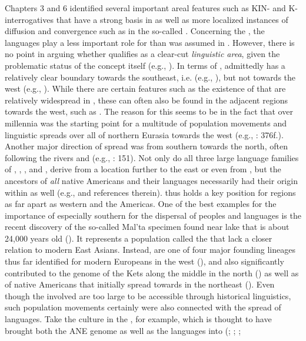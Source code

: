 Chapters 3 and 6 identified several important areal features such as KIN- and K-interrogatives that have a strong basis in  as well as more localized instances of diffusion and convergence such as in the so-called . Concerning the , the  languages play a less important role for  than was assumed in . However, there is no point in arguing whether  qualifies as a clear-cut \textit{linguistic area}, given the problematic status of the concept itself (e.g., \citealt{Campbell2006}). In terms of ,  admittedly has a relatively clear boundary towards the southeast, i.e.  (e.g., \citealt{EnfieldComrie2015}), but not towards the west (e.g., \citealt{HeggartyRenfrew2014b}). While there are certain features such as the existence of  that are relatively widespread in , these can often also be found in the adjacent regions towards the west, such as . The reason for this seems to be in the fact that  over millennia was the starting point for a multitude of population movements and linguistic spreads over all of northern Eurasia towards the west (e.g., \citealt{Nichols1997}: 376f.). Another major direction of spread was from southern  towards the north, often following the rivers  and  (e.g., \citealt{Skribnik2004}: 151). Not only do all three large language families of , , , and , derive from a location further to the east or even from , but the ancestors of \textit{all} native Americans and their languages necessarily had their origin within  as well (e.g., \citealt{LlamasFehren-Schmitz2016} and references therein).  thus holds a key position for regions as far apart as western  and the Americas. One of the best examples for the importance of especially southern  for the dispersal of peoples and languages is the recent discovery of the so-called Mal’ta specimen found near lake  that is about 24,000 years old (\citealt{RaghavanSkoglund2014}). It represents a population called the \textit{} that lack a closer relation to modern East Asians. Instead,  are one of four major founding lineages thus far identified for modern Europeans in the west (\citealt{JonesGonzales-Fortes2015}), and also significantly contributed to the genome of the Kets along the middle  in the north (\citealt{FlegontovChangmai2016}) as well as of native Americans that initially spread towards  in the northeast (\citealt{RaghavanSkoglund2014}). Even though the  involved are too large to be accessible through historical linguistics, such population movements certainly were also connected with the spread of languages. Take the  culture in the , for example, which is thought to have brought both the ANE genome as well as the  languages into  (\citealt{Anthony2007}; \citealt{AnthonyRinge2015}; \citealt{AllentoftSikora2015}; 
